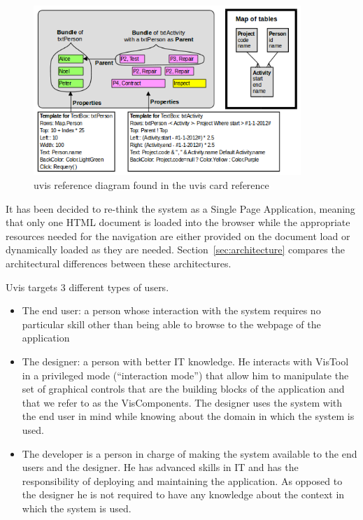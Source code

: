 \begin{figure}
    \centering
    \includegraphics[width=0.9\textwidth]{images/uvisDiagram.png}
    \caption{uvis reference diagram found in the uvis card reference}
    \label{img:refDiagram}
\end{figure}

It has been decided to re-think the system as a Single Page Application, meaning that only one HTML document is loaded into the browser while the appropriate resources needed for the navigation are either provided on the document load or dynamically loaded as they are needed. Section~\ref{sec:architecture} compares the architectural differences between these architectures.

Uvis targets 3 different types of users.

\begin{itemize}
    \item The end user: a person whose interaction with the system requires no particular skill other than being able to browse to the webpage of the application
    
    \item The designer: a person with better IT knowledge. He interacts with VisTool in a privileged mode (``interaction mode'') that allow him to manipulate the set of graphical controls that are the building blocks of the application and that we refer to as the VisComponents. The designer uses the system with the end user in mind while knowing about the domain in which the system is used. 

    \item The developer is a person in charge of making the system available to the end users and the designer. He has advanced skills in IT and has the responsibility of deploying and maintaining the application. As opposed to the designer he is not required to have any knowledge about the context in which the system is used.

\end{itemize}

